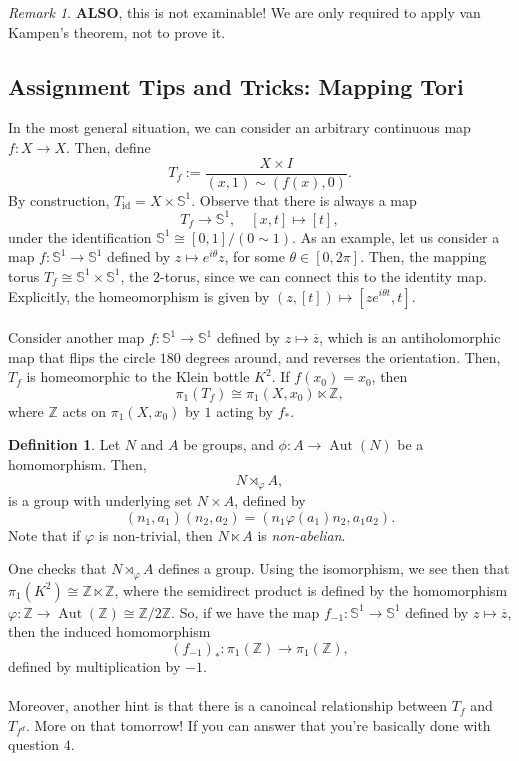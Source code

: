 \documentclass[a4paper]{report}
\theoremstyle{definition}
\newtheorem{definition}{Definition}
\theoremstyle{remark}
\newtheorem{remark}{Remark}
\theoremstyle{proposition}
\theoremstyle{conjecture}
\theoremstyle{lemma}
\theoremstyle{corollary}
\theoremstyle{exercise}
\newcommand{\on}{\operatorname}
\begin{document}
\begin{remark}
    \textbf{ALSO}, this is not examinable! We are only required to apply 
    van Kampen's theorem, not to prove it.
\end{remark}

\subsection{Assignment Tips and Tricks: Mapping Tori}

In the most general situation, we can consider an arbitrary continuous map 
$f : X \to X$. Then, define 
$$T_f := \frac{X\times I}{(x,1) \sim (f(x),0)}.$$
By construction, $T_{\on{id}} = X \times \mathbb{S}^1$.
Observe that there is always a map 
$$T_f \longrightarrow \mathbb{S}^1,\quad [x,t]\longmapsto [t],$$
under the identification $\mathbb{S}^1 \cong [0,1]/(0 \sim 1)$.
As an example, let us consider a map 
$f : \mathbb{S}^1 \to \mathbb{S}^1$ defined by $z\mapsto e^{i\theta}z$,
for some $\theta \in [0,2\pi]$. Then, the mapping torus 
$T_f \cong \mathbb{S}^1 \times \mathbb{S}^1$, the $2$-torus, since we can connect this to the identity 
map. Explicitly, the homeomorphism is given by $(z,[t]) \mapsto [ze^{i\theta t}, t]$. \\\\ 
Consider another map $f : \mathbb{S}^1 \to \mathbb{S}^1$ defined by $z\mapsto \overline{z}$,
which is an antiholomorphic map that flips the circle $180$ degrees around, 
and reverses the orientation. Then, $T_f$ is homeomorphic to the Klein bottle 
$K^2$. If $f(x_0) = x_0$, then 
$$\pi_1(T_f) \cong \pi_1(X,x_0) \ltimes \mathbb{Z},$$
where $\mathbb{Z}$ acts on $\pi_1(X,x_0)$ by $1$ acting by 
$f_\ast$. 
\begin{definition}
    Let $N$ and $A$ be groups, and $\phi : A \to \on{Aut}(N)$ be a 
    homomorphism. 
    Then, $$N \rtimes_\varphi A,$$ 
    is a group with underlying set $N\times A$, defined by 
    $$(n_1,a_1) (n_2,a_2) = (n_1 \varphi(a_1) n_2, a_1a_2).$$
    Note that if $\varphi$ is non-trivial, then $N\ltimes A$ is 
    \emph{non-abelian}.
\end{definition}
One checks that $N\rtimes_\varphi A$ defines a group.
Using the isomorphism, we see then that $\pi_1(K^2) \cong \mathbb{Z} \ltimes \mathbb{Z}$, 
where the semidirect product is defined by the homomorphism 
$\varphi : \mathbb{Z} \to \on{Aut}(\mathbb{Z}) \cong \mathbb{Z}/2\mathbb{Z}$.
So, if we have the map $f_{-1} : \mathbb{S}^1 \to \mathbb{S}^1$ 
defined by $z\mapsto \overline{z}$, then the induced homomorphism 
$$(f_{-1})_\ast : \pi_1(\mathbb{Z}) \longrightarrow \pi_1(\mathbb{Z}),$$
defined by multiplication by $-1$.\\\\
Moreover, another hint is that there is a canoincal relationship between 
$T_f$ and $T_{f^d}$. More on that tomorrow! If you can answer that you're basically 
done with question $4$.
\end{document}
